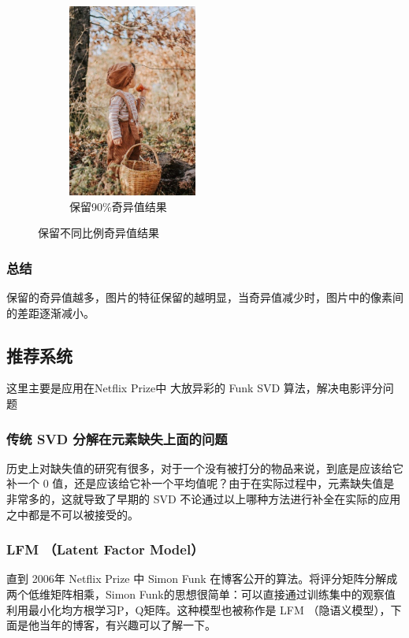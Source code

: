 \documentclass{ctexrep}
\begin{document}
\begin{figure}[h]
\begin{subfigure}{.5\textwidth}
	\label{fig:boy7}
\end{subfigure}%
\begin{subfigure}{.5\textwidth}
	\centering
	\includegraphics[width=120pt]{figures/boy90.jpg}
	\caption{保留90\%奇异值结果}
	\label{fig:boy9}
\end{subfigure}
\caption{保留不同比例奇异值结果}
\label{fig:test}
\end{figure}


\subsubsection{总结}
保留的奇异值越多，图片的特征保留的越明显，当奇异值减少时，图片中的像素间的差距逐渐减小。
\subsection{推荐系统}

这里主要是应用在Netflix Prize中 大放异彩的 Funk SVD 算法，解决电影评分问题\cite{SVD_funk}


\subsubsection{传统 SVD 分解在元素缺失上面的问题}

历史上对缺失值的研究有很多，对于一个没有被打分的物品来说，到底是应该给它补一个 0 值，还是应该给它补一个平均值呢？由于在实际过程中，元素缺失值是非常多的，这就导致了早期的 SVD 不论通过以上哪种方法进行补全在实际的应用之中都是不可以被接受的。



\subsubsection{LFM （Latent Factor Model）}

直到 2006年 Netflix Prize 中 Simon Funk 在博客公开的算法。将评分矩阵分解成两个低维矩阵相乘，Simon Funk的思想很简单：可以直接通过训练集中的观察值利用最小化均方根学习P，Q矩阵。这种模型也被称作是 LFM （隐语义模型），下面是他当年的博客，有兴趣可以了解一下。
\end{document}
